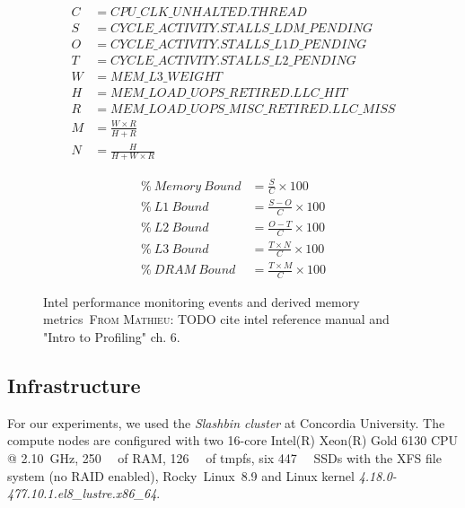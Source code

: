 \documentclass[conference]{IEEEtran}
\newcommand{\MD}[1]{\color{magenta}\textsc{From Mathieu: }#1\color{black}}
\begin{document}
\begin{figure}
	\noindent
	\begin{minipage}
		{0.5\textwidth}
		\begin{align*}
			C & = CPU\_CLK\_UNHALTED.THREAD                \\
			S & = CYCLE\_ACTIVITY.STALLS\_LDM\_PENDING     \\
			O & = CYCLE\_ACTIVITY.STALLS\_L1D\_PENDING     \\
			T & = CYCLE\_ACTIVITY.STALLS\_L2\_PENDING      \\
			W & = MEM\_L3\_WEIGHT                          \\
			H & = MEM\_LOAD\_UOPS\_RETIRED.LLC\_HIT        \\
			R & = MEM\_LOAD\_UOPS\_MISC\_RETIRED.LLC\_MISS \\
			M & = \frac{W \times R}{H + R}                 \\
			N & = \frac{H}{H + W \times R}                 
		\end{align*}
	\end{minipage}
	\begin{minipage}
		{0.5\textwidth}
		\begin{align}
			\%~Memory~Bound & = \frac{S}{C} \times 100          \\
			\%~L1~Bound     & = \frac{S - O}{C} \times 100      \\
			\%~L2~Bound     & = \frac{O - T}{C} \times 100      \\
			\%~L3~Bound     & = \frac{T \times N}{C} \times 100 \\
			\%~DRAM~Bound   & = \frac{T \times M}{C} \times 100 
		\end{align}
	\end{minipage}
	\caption{Intel performance monitoring events and derived memory metrics~\MD{TODO cite intel reference manual and "Intro to Profiling" ch. 6}.}
	\label{fig:memory-metrics}
\end{figure}

\subsection{Infrastructure}
For our experiments, we used the \textit{Slashbin cluster} at Concordia University. The compute nodes are configured with two 16-core Intel(R) Xeon(R) Gold 6130 CPU @ \SI{2.10}{\giga\hertz}, \SI{250}{\gibi\byte} of RAM, \SI{126}{\gibi\byte} of tmpfs, six \SI{447}{\gibi\byte} SSDs with the XFS file system (no RAID enabled), Rocky~Linux~8.9 and Linux kernel \textit{4.18.0-477.10.1.el8\_lustre.x86\_64}.
\end{document}
